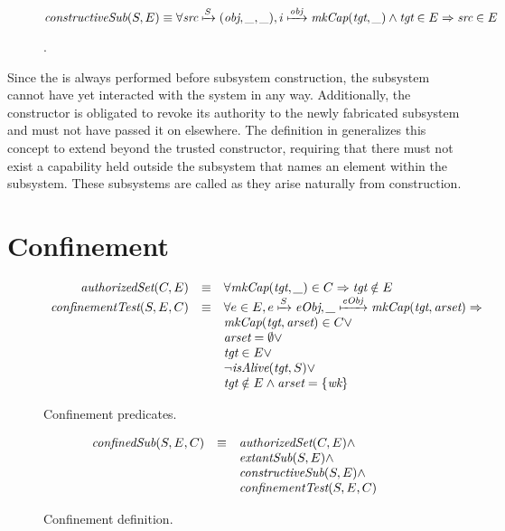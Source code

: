 \begin{figure}
  \[
  \FNconstrSub{S}{E} \equiv \forall \mapsTo{\ident{src}}{(\ident{obj},\ident{\_},\ident{\_})}{S} , \mapsTo{i}{\FNmkCap{\ident{tgt}}{\ident{\_}}}{\ident{obj}} \wedge \ident{tgt} \in E \Rightarrow \ident{src} \in E
  \]
  \caption{\xmakefirstuc{\TMconstrSubs}. \label{fig:sketch:constructive}}
\end{figure}

Since the \TMconfinementTest{} is always performed before subsystem construction, the subsystem cannot have yet interacted with the system in any way.
Additionally, the constructor is obligated to revoke its authority to the newly fabricated subsystem and must not have passed it on elsewhere.
The definition in  generalizes this concept to extend beyond the trusted constructor, requiring that there must not exist a capability held outside the subsystem that names an element within the subsystem.
These subsystems are called \term{\TMconstrSubs} as they arise naturally from construction.

\section{Confinement}
\label{sect:sketch:confinement}


\begin{figure}
  \[
  \begin{array}{rcl}
    \FNauthorizedSet{C}{E} & \equiv & \forall \FNmkCap{\ident{tgt}}{\ident{\_}} \in C \Rightarrow \ident{tgt} \notin E \\
    \FNconfinementTest{S}{E}{C} & \equiv & \forall e \in E , \mapsTo{e}{\ident{eObj}}{S} , \mapsTo{\ident{\_}}{\FNmkCap{\ident{tgt}}{\ident{arset}}}{\ident{eObj}} \Rightarrow \\
    & & \FNmkCap{\ident{tgt}}{\ident{arset}} \in C \vee \\
    & & \ident{arset} = \emptyset \vee \\
    & & \ident{tgt} \in E \vee \\
    & & \neg \FNisAlive{\ident{tgt}}{S} \vee \\
    & & \ident{tgt} \notin E \wedge \ident{arset} = \{\NMwk\}
  \end{array}
  \]
  \caption{Confinement predicates.  \label{fig:sketch:confinementTest}}
\end{figure}

\begin{figure}
  \[
  \begin{array}{rcl}
    \FNconfinedSub{S}{E}{C} & \equiv & \FNauthorizedSet{C}{E} \wedge \\
    & & \FNextantSub{S}{E} \wedge \\
    & & \FNconstrSub{S}{E} \wedge \\
    & & \FNconfinementTest{S}{E}{C}
  \end{array}
  \]
  \caption{Confinement definition.   \label{fig:sketch:confinedSub}}
\end{figure}

